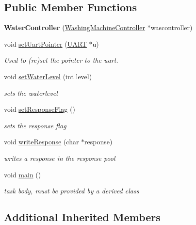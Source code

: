 \subsection*{Public Member Functions}
\begin{DoxyCompactItemize}
\item 
{\bfseries Water\+Controller} (\hyperlink{class_washing_machine_controller}{Washing\+Machine\+Controller} $\ast$wascontroller)\hypertarget{class_water_controller_a3bda64ac4cf2a0b08c2fbb8e52874aaa}{}\label{class_water_controller_a3bda64ac4cf2a0b08c2fbb8e52874aaa}

\item 
void \hyperlink{class_water_controller_ac7421f33e418ce11509802ff9486513b}{set\+Uart\+Pointer} (\hyperlink{class_u_a_r_t}{U\+A\+RT} $\ast$u)
\begin{DoxyCompactList}\small\item\em Used to (re)set the pointer to the uart. \end{DoxyCompactList}\item 
void \hyperlink{class_water_controller_a513f385f75e0e358e6fee6726c625454}{set\+Water\+Level} (int level)
\begin{DoxyCompactList}\small\item\em sets the waterlevel \end{DoxyCompactList}\item 
void \hyperlink{class_water_controller_ada996735d82efcda3dd47016d08693e7}{set\+Response\+Flag} ()
\begin{DoxyCompactList}\small\item\em sets the response flag \end{DoxyCompactList}\item 
void \hyperlink{class_water_controller_a833f22a3c64097e8c557db7231c77e51}{write\+Response} (char $\ast$response)
\begin{DoxyCompactList}\small\item\em writes a response in the response pool \end{DoxyCompactList}\item 
void \hyperlink{class_water_controller_a617fdcb283f49ef2e512a75fe5a72950}{main} ()
\begin{DoxyCompactList}\small\item\em task body, must be provided by a derived class \end{DoxyCompactList}\end{DoxyCompactItemize}
\subsection*{Additional Inherited Members}


